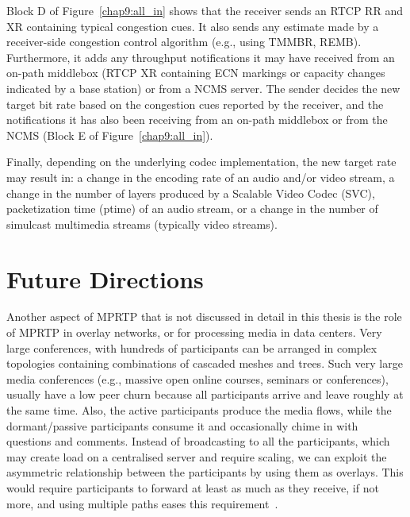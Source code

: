 Block D of Figure~\ref{chap9:all_in} shows that the receiver sends an RTCP
RR and XR containing typical congestion cues. It also sends any estimate made
by a receiver-side congestion control algorithm (e.g., using TMMBR, REMB).
Furthermore, it adds any throughput notifications it may have received from an
on-path middlebox (RTCP XR containing ECN markings or capacity changes
indicated by a base station) or from a NCMS server. The sender decides the new
target bit rate based on the congestion cues reported by the receiver, and the
notifications it has also been receiving from an on-path middlebox or from the
NCMS (Block E of Figure~\ref{chap9:all_in}).


Finally, depending on the underlying codec implementation, the new target rate
may result in: a change in the encoding rate of an audio and/or video stream,
a change in the number of layers produced by a Scalable Video Codec (SVC),
packetization time (ptime) of an audio stream, or a change in the number of
simulcast multimedia streams (typically video streams).

\section{Future Directions}

Another aspect of MPRTP that is not discussed in detail in this thesis is the
role of MPRTP in overlay networks, or for processing media in data centers. Very
large conferences, with hundreds of participants can be arranged in complex
topologies containing combinations of cascaded meshes and trees. Such very
large media conferences (e.g., massive open online courses, seminars or
conferences), usually have a low peer churn because all participants arrive
and leave roughly at the same time. Also, the active participants produce the
media flows, while the dormant/passive participants consume it and occasionally
chime in with questions and comments. Instead of broadcasting to all the
participants, which may create load on a centralised server and require
scaling, we can exploit the asymmetric relationship between the participants
by using them as overlays. This would require participants to forward at least
as much as they receive, if not more, and using multiple paths eases this
requirement~\cite{Noh2008,Li2010a,Globisch:AsymGrpComm}.



